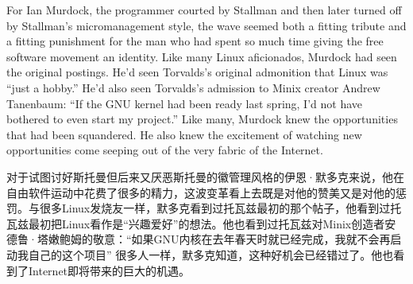 \ifdefined\eng
For Ian Murdock, the programmer courted by Stallman and then later turned off by Stallman's micromanagement style, the wave seemed both a fitting tribute and a fitting punishment for the man who had spent so much time giving the free software movement an identity. Like many Linux aficionados, Murdock had seen the original postings. He'd seen Torvalds's original admonition that Linux was ``just a hobby.'' He'd also seen Torvalds's admission to Minix creator Andrew Tanenbaum: ``If the GNU kernel had been ready last spring, I'd not have bothered to even start my project.'' Like many, Murdock knew the opportunities that had been squandered. He also knew the excitement of watching new opportunities come seeping out of the very fabric of the Internet.
\fi

\ifdefined\chs
对于试图讨好斯托曼但后来又厌恶斯托曼的徽管理风格的伊恩·默多克来说，他在自由软件运动中花费了很多的精力，这波变革看上去既是对他的赞美又是对他的惩罚。与很多Linux发烧友一样，默多克看到过托瓦兹最初的那个帖子，他看到过托瓦兹最初把Linux看作是``兴趣爱好''的想法。他也看到过托瓦兹对Minix创造者安德鲁·塔嫩鲍姆的敬意：``如果GNU内核在去年春天时就已经完成，我就不会再启动我自己的这个项目'' 很多人一样，默多克知道，这种好机会已经错过了。他也看到了Internet即将带来的巨大的机遇。
\fi

